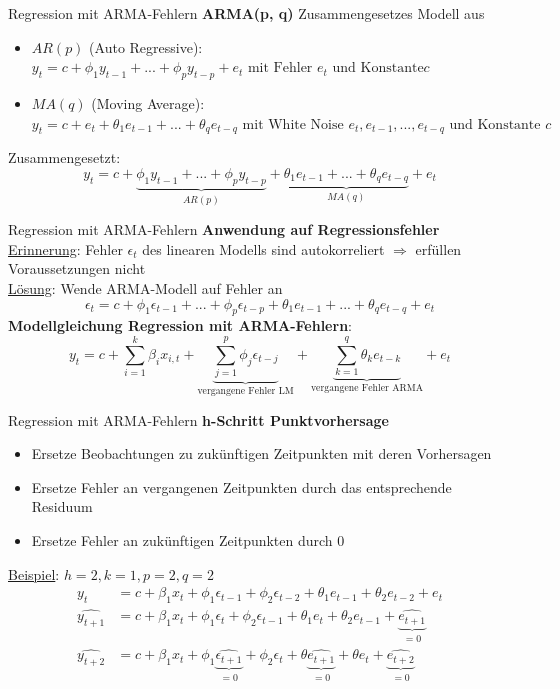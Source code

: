\begin{frame}{Regression mit ARMA-Fehlern}
	\textbf{ARMA(p, q)}
	Zusammengesetzes Modell aus
	\begin{itemize}
		\item $AR(p)$ (Auto Regressive): $y_{t} = c + \phi_1 y_{t-1} + ... + \phi_p y_{t-p} + e_t \text{ mit Fehler }e_t\text{ und Konstante}c$
		\item $MA(q)$ (Moving Average): $y_{t} = c + e_t + \theta_1 e_{t-1} + ... + \theta_q e_{t-q}\text{ mit White Noise }e_t,e_{t-1},...,e_{t-q}\text{ und Konstante }c$
	\end{itemize}
	Zusammengesetzt:
	$$y_{t} = c + \underbrace{\phi_1 y_{t-1} + ... + \phi_p y_{t-p}}_{AR(p)} + \underbrace{\theta_1 e_{t-1} + ... + \theta_q e_{t-q}}_{MA(q)} + e_t$$
\end{frame}

\begin{frame}{Regression mit ARMA-Fehlern}
	\textbf{Anwendung auf Regressionsfehler} \\
	\underline{Erinnerung}: Fehler $\epsilon_t$ des linearen Modells sind autokorreliert $\Rightarrow$ erfüllen Voraussetzungen nicht\\
	\underline{Lösung}: Wende ARMA-Modell auf Fehler an
	$$\epsilon_{t} = c + \phi_1 \epsilon_{t-1} + ... + \phi_p \epsilon_{t-p} + \theta_1 e_{t-1} + ... + \theta_q e_{t-q} + e_t$$
	\textbf{Modellgleichung Regression mit ARMA-Fehlern}:
	$$y_t = c + \sum_{i=1}^{k}{\beta_i x_{i,t}} + \underbrace{\sum_{j=1}^{p}{\phi_j\epsilon_{t-j}}}_{\text{vergangene Fehler LM}} + \underbrace{\sum_{k=1}^{q}{\theta_k e_{t-k}}}_{\text{vergangene Fehler ARMA}} + e_t$$
	
\end{frame}

\begin{frame}{Regression mit ARMA-Fehlern}
	\textbf{h-Schritt Punktvorhersage}\\
	\begin{itemize}
		\item Ersetze Beobachtungen zu zukünftigen Zeitpunkten mit deren Vorhersagen
		\item Ersetze Fehler an vergangenen Zeitpunkten durch das entsprechende Residuum
		\item Ersetze Fehler an zukünftigen Zeitpunkten durch 0
	\end{itemize}
	\underline{Beispiel}: $h=2, k=1, p=2, q=2$
	\begin{align*}
		y_t &= c + \beta_1 x_{t} + \phi_1\epsilon_{t-1} + \phi_2\epsilon_{t-2} + \theta_1e_{t-1} + \theta_2e_{t-2} + e_t \\		
		\widehat{y_{t+1}} &= c + \beta_1 x_{t} + \phi_1\epsilon_{t} + \phi_2\epsilon_{t-1} + \theta_1e_{t} + \theta_2e_{t-1} + \underbrace{\widehat{e_{t+1}}}_{=0}\\
		\widehat{y_{t+2}} &= c + \beta_1 x_{t} + \phi_1\underbrace{\widehat{\epsilon_{t+1}}}_{=0} + \phi_2\epsilon_t + \theta \underbrace{\widehat{e_{t+1}}}_{=0} + \theta e_t + \underbrace{\widehat{e_{t+2}}}_{=0}
	\end{align*}
	 
\end{frame}

